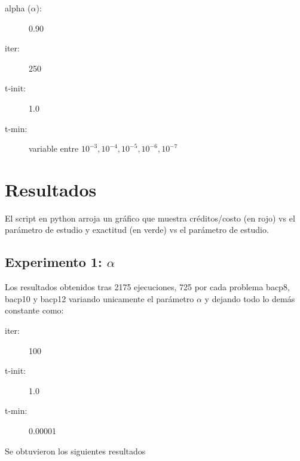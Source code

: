 \documentclass[letterpaper,10pt]{article}
\begin{document}
\begin{description}
  \item[alpha ($\alpha$):] 0.90
  \item[iter:] 250
  \item[t-init:] 1.0
  \item[t-min:] variable entre $10^{-3}, 10^{-4}, 10^{-5}, 10^{-6}, 10^{-7}$
\end{description}

\section{Resultados}

El script en python arroja un gráfico que muestra créditos/costo (en rojo) vs el parámetro de estudio y exactitud (en verde) vs el parámetro de estudio.

\subsection{Experimento 1: $\alpha$}

Los resultados obtenidos tras 2175 ejecuciones, 725 por cada problema bacp8, bacp10 y bacp12 variando unicamente el parámetro $\alpha$ y dejando todo lo demás constante como:
\begin{description}
    \item[iter:] 100
    \item[t-init:] 1.0
    \item[t-min:] 0.00001
\end{description}
Se obtuvieron los siguientes resultados
\end{document}
